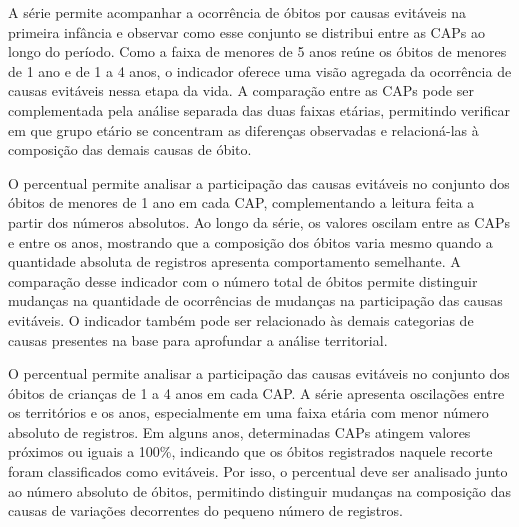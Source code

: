 
A série permite acompanhar a ocorrência de óbitos por causas evitáveis na primeira infância e observar como esse conjunto se distribui entre as CAPs ao longo do período. Como a faixa de menores de 5 anos reúne os óbitos de menores de 1 ano e de 1 a 4 anos, o indicador oferece uma visão agregada da ocorrência de causas evitáveis nessa etapa da vida. A comparação entre as CAPs pode ser complementada pela análise separada das duas faixas etárias, permitindo verificar em que grupo etário se concentram as diferenças observadas e relacioná-las à composição das demais causas de óbito.


O percentual permite analisar a participação das causas evitáveis no conjunto dos óbitos de menores de 1 ano em cada CAP, complementando a leitura feita a partir dos números absolutos. Ao longo da série, os valores oscilam entre as CAPs e entre os anos, mostrando que a composição dos óbitos varia mesmo quando a quantidade absoluta de registros apresenta comportamento semelhante. A comparação desse indicador com o número total de óbitos permite distinguir mudanças na quantidade de ocorrências de mudanças na participação das causas evitáveis. O indicador também pode ser relacionado às demais categorias de causas presentes na base para aprofundar a análise territorial.


O percentual permite analisar a participação das causas evitáveis no conjunto dos óbitos de crianças de 1 a 4 anos em cada CAP. A série apresenta oscilações entre os territórios e os anos, especialmente em uma faixa etária com menor número absoluto de registros. Em alguns anos, determinadas CAPs atingem valores próximos ou iguais a 100\%, indicando que os óbitos registrados naquele recorte foram classificados como evitáveis. Por isso, o percentual deve ser analisado junto ao número absoluto de óbitos, permitindo distinguir mudanças na composição das causas de variações decorrentes do pequeno número de registros.

